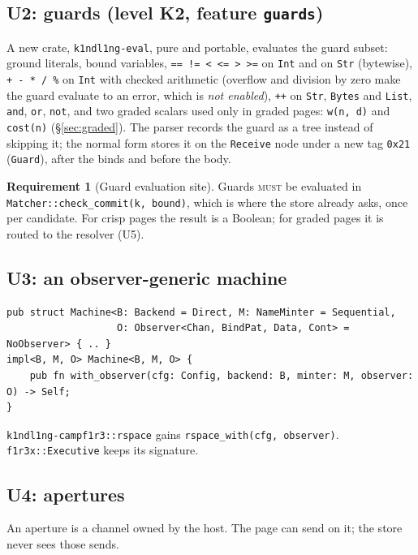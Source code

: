 \documentclass[11pt]{article}
\theoremstyle{definition}
\newtheorem{requirement}{Requirement}
\theoremstyle{remark}
\newcommand{\MUST}{\textsc{must}}
\newcommand{\code}[1]{\texttt{#1}}
\begin{document}
\subsection{U2: guards (level K2, feature \code{guards})}\label{sec:u-guards}

A new crate, \code{k1ndl1ng-eval}, pure and portable, evaluates the guard subset:
ground literals, bound variables, \code{== != < <= > >=} on \code{Int} and on
\code{Str} (bytewise), \code{+ - * / \%} on \code{Int} with checked arithmetic
(overflow and division by zero make the guard evaluate to an error, which is
\emph{not enabled}), \code{++} on \code{Str}, \code{Bytes} and \code{List},
\code{and}, \code{or}, \code{not}, and two graded scalars used only in graded pages:
\code{w(n, d)} and \code{cost(n)} (\S\ref{sec:graded}). The parser records the guard
as a tree instead of skipping it; the normal form stores it on the \code{Receive}
node under a new tag \code{0x21} (\code{Guard}), after the binds and before the body.

\begin{requirement}[Guard evaluation site]
Guards \MUST{} be evaluated in \code{Matcher::check\_commit(k, bound)}, which is
where the store already asks, once per candidate. For crisp pages the result is a
Boolean; for graded pages it is routed to the resolver (U5).
\end{requirement}

\subsection{U3: an observer-generic machine}\label{sec:u-observer}
\begin{lstlisting}[language=RustLite]
pub struct Machine<B: Backend = Direct, M: NameMinter = Sequential,
                   O: Observer<Chan, BindPat, Data, Cont> = NoObserver> { .. }
impl<B, M, O> Machine<B, M, O> {
    pub fn with_observer(cfg: Config, backend: B, minter: M, observer: O) -> Self;
}
\end{lstlisting}
\code{k1ndl1ng-campf1r3::rspace} gains \code{rspace\_with(cfg, observer)}.
\code{f1r3x::Executive} keeps its signature.

\subsection{U4: apertures}\label{sec:u-apertures}

An aperture is a channel owned by the host. The page can send on it; the store
never sees those sends.
\end{document}
